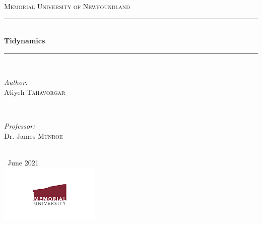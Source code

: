 \documentclass[12pt, a4paper, twoside]{report}
\begin{document}
\begin{titlepage}

\newcommand{\HRule}{\rule{\linewidth}{0.5mm}} 

\center 
 

\textsc{\large Memorial University of Newfoundland}\\[1.5cm] 


\HRule \\[0.4cm]
{ \huge \bfseries Tidynamics}\\[0.4cm] 
\HRule \\[1.5cm]
 

\begin{minipage}{0.4\textwidth}
\begin{flushleft} \large
\emph{Author:}\\
Atiyeh \textsc{Tahavorgar}
\end{flushleft}
\end{minipage}
~
\begin{minipage}{0.4\textwidth}
\begin{flushright} \large
\emph{Professor:} \\
Dr. James \textsc{Munroe} 

\end{flushright}
\end{minipage}\\[2cm]
{\normalsize \ June 2021}\\[2cm]


\includegraphics{Memorial-University-of-Newfoundland5.png}\\[1cm] 

\end{titlepage}



\end{document}
